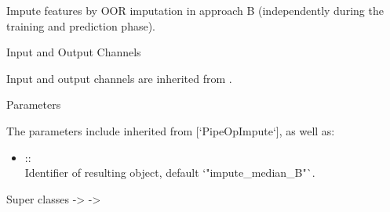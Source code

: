 \documentclass[letterpaper]{book}
\begin{document}
%
\begin{Description}\relax
Impute features by OOR imputation in approach B (independently during the training and prediction phase).
\end{Description}
%
\begin{Section}{Input and Output Channels}

Input and output channels are inherited from .
\end{Section}
%
\begin{Section}{Parameters}

The parameters include inherited from [`PipeOpImpute`], as well as: \\{}
\begin{itemize}

\item{}  :: \\{}
Identifier of resulting object, default `"impute\_median\_B"`.

\end{itemize}

\end{Section}
%
\begin{Section}{Super classes}
 ->  -> 
\end{Section}
%
\end{document}
